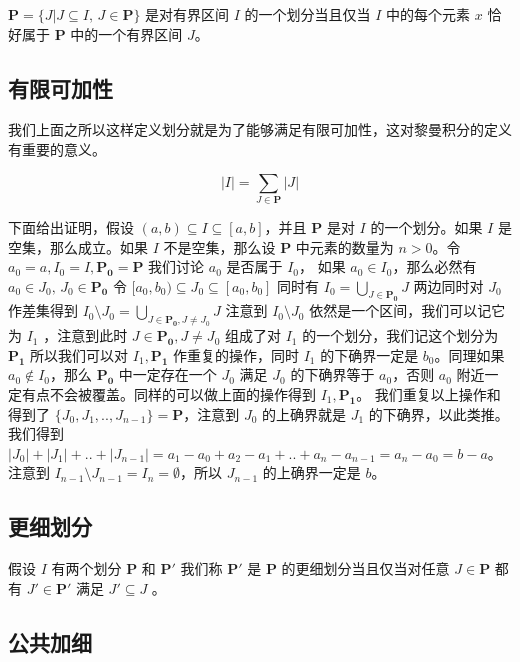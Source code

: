 $\mathbf{P} = \{ J \vert J \subseteq I,\, J \in \mathbf{P} \}$ 是对有界区间 $I$ 的一个划分当且仅当 $I$ 中的每个元素 $x$ 恰好属于 $\mathbf{P}$ 中的一个有界区间 $J$。

\subsection{有限可加性}

我们上面之所以这样定义划分就是为了能够满足有限可加性，这对黎曼积分的定义有重要的意义。

\[
    \lvert I \rvert = \sum_{J \in \mathbf{P}} \lvert J \rvert
\]

下面给出证明，假设 $(a,b) \subseteq I \subseteq [a,b] $，并且 $\mathbf{P}$ 是对 $I$ 的一个划分。如果 $I$ 是空集，那么成立。如果 $I$ 不是空集，那么设 $\mathbf{P}$ 中元素的数量为 $n > 0$。令 $a_0=a, I_0 = I, \mathbf{P_0} = \mathbf{P}$ 我们讨论 $a_0$ 是否属于 $I_0$，
如果 $a_0 \in I_0$，那么必然有 $a_0 \in J_0 ,\, J_0 \in \mathbf{P_0}$ 令 $[a_0, b_0) \subseteq J_0 \subseteq [a_0, b_0]$ 同时有 $I_0 = \bigcup_{J \in \mathbf{P_0}} J $ 两边同时对 $J_0$ 作差集得到 $I_0 \setminus J_0 = \bigcup_{J \in \mathbf{P_0}, J \ne J_0}J$ 
注意到 $I_0 \setminus J_0$ 依然是一个区间，我们可以记它为 $I_1$ ，注意到此时 $J \in \mathbf{P_0}, J \ne J_0$ 组成了对 $I_1$ 的一个划分，我们记这个划分为 $\mathbf{P_1}$ 所以我们可以对 $I_1, \mathbf{P_1}$ 作重复的操作，同时 $I_1$ 的下确界一定是 $b_0$。同理如果 $a_0 \notin I_0$，那么 $\mathbf{P_0}$ 中一定存在一个 $J_0$ 满足 $J_0$ 的下确界等于 $a_0$，否则 $a_0$ 附近一定有点不会被覆盖。同样的可以做上面的操作得到 $I_1, \mathbf{P_1}$。
我们重复以上操作和得到了 $\{ J_0, J_1, .., J_{n-1} \} = \mathbf{P}$，注意到 $J_0$ 的上确界就是 $J_1$ 的下确界，以此类推。我们得到 $\lvert J_0 \rvert + \lvert J_1 \rvert  + .. + \lvert J_{n-1} \rvert = a_1 -a_0 + a_2 - a_1 + .. + a_n - a_{n-1} = a_n - a_0 = b - a$。
注意到 $I_{n-1} \setminus J_{n-1} = I_n = \emptyset$，所以 $J_{n-1}$ 的上确界一定是 $b$。

\subsection{更细划分}

假设 $I $ 有两个划分 $\mathbf{P}$ 和 $\mathbf{P'}$ 我们称 $\mathbf{P'}$ 是 $\mathbf{P}$ 的更细划分当且仅当对任意 $J \in \mathbf{P}$ 都有 $J' \in \mathbf{P'}$ 满足 $J' \subseteq J$ 。

\subsection{公共加细}

